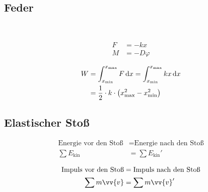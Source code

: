 \subsection{Feder}

\begin{boxleft}
\\
\end{boxleft}\begin{boxrightshaded}
\begin{align*}
F&=-kx\\
M&=-D\varphi
\end{align*}
\end{boxrightshaded}

\begin{boxleft}
\end{boxleft}\begin{boxrightshaded}
\begin{align*}
W	&=\int_{x_\text{min}}^{x_\text{max}}F\mathop{}\!\mathrm{d} x=\int_{x_\text{min}}^{x_\text{max}}kx\mathop{}\!\mathrm{d} x\\
	&=\frac{1}{2}\cdot k\cdot \left(x_{\text{max}}^2-x_{\text{min}}^2\right)
\end{align*}
\end{boxrightshaded}

\subsection{Elastischer Stoß}

\begin{boxleft}
\end{boxleft}\begin{boxrightshaded}
\begin{align*}
\text{Energie vor den Stoß} &= \text{Energie nach den Stoß}\nonumber\\
\sum E_{\text{kin}}&=\sum E_{\text{kin}}'
\end{align*}
\end{boxrightshaded}

\begin{boxleft}
\end{boxleft}\begin{boxrightshaded}
\begin{align*}
\text{Impuls vor den Stoß} &= \text{Impuls nach den Stoß}\nonumber\\
\sum m\vv{v}&= \sum m\vv{v}'
\end{align*}
\end{boxrightshaded}

